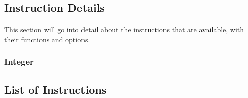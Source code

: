 \documentclass[letterpaper, 11pt]{article}
\begin{document}
\subsection{Instruction Details}
\paragraph{}This section will go into detail about the instructions that are available, with their functions and options.\\
\subsubsection{Integer}

\subsection{List of Instructions}
\end{document}
